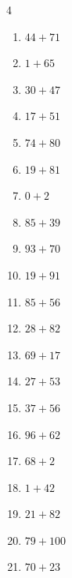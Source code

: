\begin{multicols}{4}
\begin{enumerate}
  \item $44+71$
        \phantom{$=115$}

  \item $1+65$
        \phantom{$=66$}

  \item $30+47$
        \phantom{$=77$}

  \item $17+51$
        \phantom{$=68$}

  \item $74+80$
        \phantom{$=154$}

  \item $19+81$
        \phantom{$=100$}

  \item $0+2$
        \phantom{$=2$}

  \item $85+39$
        \phantom{$=124$}

  \item $93+70$
        \phantom{$=163$}

  \item $19+91$
        \phantom{$=110$}

  \item $85+56$
        \phantom{$=141$}

  \item $28+82$
        \phantom{$=110$}

  \item $69+17$
        \phantom{$=86$}

  \item $27+53$
        \phantom{$=80$}

  \item $37+56$
        \phantom{$=93$}

\columnbreak %

  \item $96+62$
        \phantom{$=158$}

  \item $68+2$
        \phantom{$=70$}

  \item $1+42$
        \phantom{$=43$}

  \item $21+82$
        \phantom{$=103$}

  \item $79+100$
        \phantom{$=179$}

  \item $70+23$
        \phantom{$=93$}


\end{enumerate}
\end{multicols}
